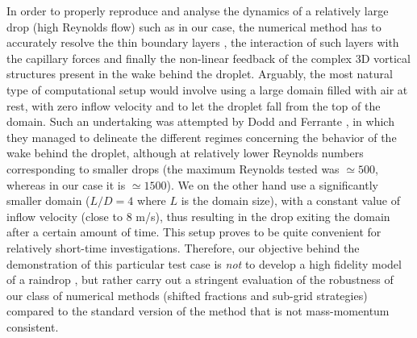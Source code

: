 In order to properly reproduce and analyse the dynamics 
of a relatively large drop (high Reynolds flow) such as in our case, 
the numerical method has to accurately resolve the thin boundary layers 
, 
the interaction of such layers with the capillary forces and finally 
the non-linear feedback of the complex 
3D vortical structures present in the wake behind the droplet.
Arguably, the most natural type of computational setup would involve using 
a large domain filled with air at rest, with zero inflow velocity and to
let the droplet fall from the top of the domain.
Such an undertaking was attempted by Dodd and Ferrante \cite{dodd2014}, 
in which they managed to delineate the different regimes concerning the 
behavior of the wake behind the droplet, although at relatively 
lower Reynolds numbers corresponding to smaller drops 
(the maximum Reynolds tested was $\simeq 500$, whereas in our case it is $\simeq 1500$).    
We on the other hand use a significantly smaller domain ($L/D = 4$ where $L$ is the domain size), 
with a constant value of inflow velocity (close to $8$ m/s), thus resulting in the drop 
exiting the domain after a certain amount of time. 
This setup proves to be quite convenient for relatively short-time investigations.
Therefore, our objective behind the demonstration of this particular 
test case is \textit{not} to develop a high fidelity model of a raindrop 
, 
but rather carry out a stringent evaluation of the robustness of our class of 
numerical methods (shifted fractions and sub-grid strategies) 
compared to the standard version of the method that is not mass-momentum consistent. 

